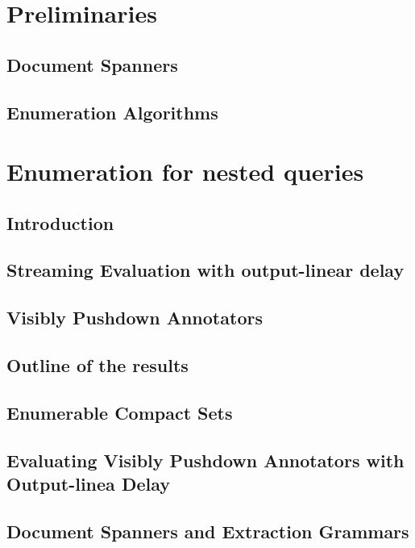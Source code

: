 \documentclass[pdftex]{pucthesis}	%
\begin{document}
\chapter[PRELIMINARIES]{Preliminaries}

\section{Document Spanners}

\section{Enumeration Algorithms}


\chapter[ENUMERATION FOR NESTED QUERIES]{Enumeration for nested queries} \label{ch1}

\section{Introduction}

\section{Streaming Evaluation with output-linear delay}

\section{Visibly Pushdown Annotators}

\section{Outline of the results}

\section{Enumerable Compact Sets}

\section{Evaluating Visibly Pushdown Annotators with Output-linea Delay}

\section{Document Spanners and Extraction Grammars}
\end{document}
